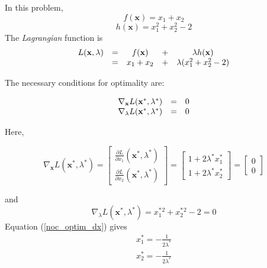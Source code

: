 \documentclass[twoside]{article}
\begin{document}
In this problem,
\[ f(\mathbf{x}) = x_1 + x_2 \]
\[ h(\mathbf{x}) = x_1^2 + x_2^2 - 2 \]
The \textit{Lagrangian }function is
\begin{equation}
\begin{array}{c c c c c}
 L(\mathbf{x}, \lambda) & =&  f(\mathbf{x}) & +& \lambda h(\mathbf{x}) \\
  & =& x_1 + x_2 & + & \lambda(x_1^2 + x_2^2 - 2)
\end{array}
\end{equation}


The necessary conditions for optimality are: 

\begin{equation} \label{noc_optim1}
\begin{array}{c c c}
\nabla_\mathbf{x} L(\mathbf{x}^*,\lambda^*) &=& 0 \\
\nabla_\lambda L(\mathbf{x}^*,\lambda^*) &=& 0 \\
\end{array}
\end{equation}

Here, 

\begin{equation} \label{noc_optim_dx}
\nabla_\mathbf{x} L(\mathbf{x}^*,\lambda^*) = 
\begin{bmatrix}
    \frac{\partial L}{\partial x_1}(\mathbf{x}^*,\lambda^*) \\
    \frac{\partial L}{\partial x_2}(\mathbf{x}^*,\lambda^*) 
\end{bmatrix}
=
\begin{bmatrix}
    1 + 2 \lambda^* x_1^* \\
    1 + 2 \lambda^* x_2^*
\end{bmatrix}
= 
\begin{bmatrix}
    0 \\
    0
\end{bmatrix}
\end{equation}

and 
\begin{equation} \label{noc_optim_dlambda}
\nabla_\lambda L(\mathbf{x}^*,\lambda^*) = 
x_1^*^2 + x_2^*^2 - 2 = 0
\end{equation}
Equation (\ref{noc_optim_dx}) gives 
\begin{equation} \label{ex_sol_part1}
    \begin{array}{c}
        x_1^* = - \frac{1}{2 \lambda^*} \\
        x_2^* = - \frac{1}{2 \lambda^*}
    \end{array}
\end{equation}
\end{document}
